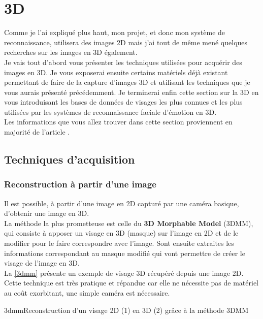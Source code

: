 \documentclass[poster]{polytech/polytech}
\begin{document}
\newpage
\section{3D}
\label{sec:3d}

Comme je l'ai expliqué plus haut, mon projet, et donc mon système de reconnaissance, utilisera des images 2D mais j'ai tout de même mené quelques recherches sur les images en 3D également.\\
Je vais tout d'abord vous présenter les techniques utilisées pour acquérir des images en 3D. Je vous exposerai ensuite certains matériels déjà existant permettant de faire de la capture d'images 3D et utilisant les techniques que je vous aurais présenté précédemment. Je terminerai enfin cette section sur la 3D en vous introduisant les bases de données de visages les plus connues et les plus utilisées par les systèmes de reconnaissance faciale d'émotion en 3D.\\
Les informations que vous allez trouver dans cette section proviennent en majorité de l'article \cite{sota3d}.

\subsection{Techniques d'acquisition}
\label{subsec:tech}

\subsubsection{Reconstruction à partir d'une image}
\label{single_img_reconstruct}
Il est possible, à partir d'une image en 2D capturé par une caméra basique, d'obtenir une image en 3D.\\
La méthode la plus prometteuse est celle du \textbf{3D Morphable Model} (3DMM), qui consiste à apposer un visage en 3D (masque) sur l'image en 2D et de le modifier pour le faire correspondre avec l'image. Sont ensuite extraites les informations correspondant au masque modifié qui vont permettre de créer le visage de l'image en 3D.\\
La \autoref{3dmm} présente un exemple de visage 3D récupéré depuis une image 2D.\\
Cette technique est très pratique et répandue car elle ne nécessite pas de matériel au coût exorbitant, une simple caméra est nécessaire.

\begin{Figure}{3dmm}{Reconstruction d'un visage 2D (1) en 3D (2) grâce à la méthode 3DMM}
\end{Figure}
\end{document}
